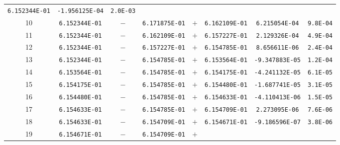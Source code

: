 \begin{example}
\begin{longtable}[t]{c|c|c|c|c|c|c|c}
        \texttt{6.152344E-01} & \texttt{-1.956125E-04} & \texttt{2.0E-03} \\
        10                    &
        \texttt{6.152344E-01} & \(-\)                  &
        \texttt{6.171875E-01} & \(+\)                  &
        \texttt{6.162109E-01} & \texttt{6.215054E-04}  & \texttt{9.8E-04} \\
        11                    &
        \texttt{6.152344E-01} & \(-\)                  &
        \texttt{6.162109E-01} & \(+\)                  &
        \texttt{6.157227E-01} & \texttt{2.129326E-04}  & \texttt{4.9E-04} \\
        12                    &
        \texttt{6.152344E-01} & \(-\)                  &
        \texttt{6.157227E-01} & \(+\)                  &
        \texttt{6.154785E-01} & \texttt{8.656611E-06}  & \texttt{2.4E-04} \\
        13                    &
        \texttt{6.152344E-01} & \(-\)                  &
        \texttt{6.154785E-01} & \(+\)                  &
        \texttt{6.153564E-01} & \texttt{-9.347883E-05} & \texttt{1.2E-04} \\
        14                    &
        \texttt{6.153564E-01} & \(-\)                  &
        \texttt{6.154785E-01} & \(+\)                  &
        \texttt{6.154175E-01} & \texttt{-4.241132E-05} & \texttt{6.1E-05} \\
        15                    &
        \texttt{6.154175E-01} & \(-\)                  &
        \texttt{6.154785E-01} & \(+\)                  &
        \texttt{6.154480E-01} & \texttt{-1.687741E-05} & \texttt{3.1E-05} \\
        16                    &
        \texttt{6.154480E-01} & \(-\)                  &
        \texttt{6.154785E-01} & \(+\)                  &
        \texttt{6.154633E-01} & \texttt{-4.110413E-06} & \texttt{1.5E-05} \\
        17                    &
        \texttt{6.154633E-01} & \(-\)                  &
        \texttt{6.154785E-01} & \(+\)                  &
        \texttt{6.154709E-01} & \texttt{2.273095E-06}  & \texttt{7.6E-06} \\
        18                    &
        \texttt{6.154633E-01} & \(-\)                  &
        \texttt{6.154709E-01} & \(+\)                  &
        \texttt{6.154671E-01} & \texttt{-9.186596E-07} & \texttt{3.8E-06} \\
        19                    &
        \texttt{6.154671E-01} & \(-\)                  &
        \texttt{6.154709E-01} & \(+\)                  &

\end{longtable}
\end{example}
